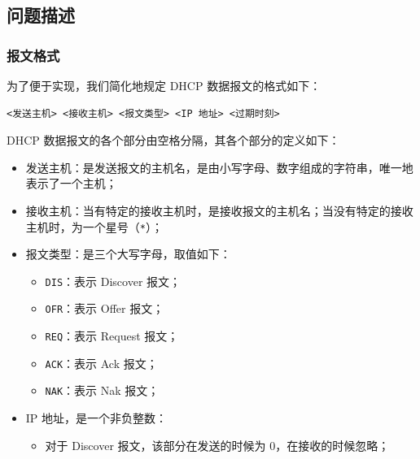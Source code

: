 \subsection*{问题描述}

\subsubsection*{报文格式}

为了便于实现，我们简化地规定 DHCP 数据报文的格式如下：

\begin{lstlisting}
<发送主机> <接收主机> <报文类型> <IP 地址> <过期时刻>
\end{lstlisting}

DHCP 数据报文的各个部分由空格分隔，其各个部分的定义如下：

\begin{itemize}

    \item 发送主机：是发送报文的主机名，{}是由小写字母、数字组成的字符串，唯一地表示了一个主机；

    \item 接收主机：当有特定的接收主机时，是接收报文的主机名；当没有特定的接收主机时，为一个星号（\verb|*|）；

    \item 报文类型：是三个大写字母，取值如下：\begin{itemize}

              \item \verb|DIS|：表示 Discover 报文；

              \item \verb|OFR|：表示 Offer 报文；

              \item \verb|REQ|：表示 Request 报文；

              \item \verb|ACK|：表示 Ack 报文；

              \item \verb|NAK|：表示 Nak 报文；

          \end{itemize}



    \item IP 地址，是一个非负整数：\begin{itemize}

              \item 对于 Discover 报文，该部分在发送的时候为 0，在接收的时候忽略；


\end{itemize}
\end{itemize}
